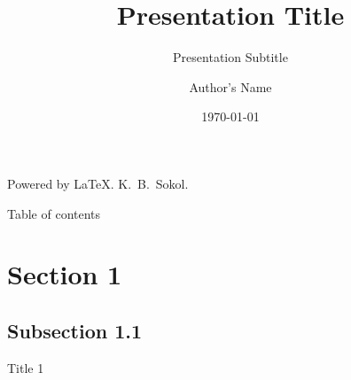 \documentclass[aspectratio=169]{beamer}
\begin{document}
\title{Presentation Title}
\subtitle{Presentation Subtitle}
\author{Author's Name}
\date{\today}

{
\begin{frame}[plain]
  \begin{minipage}{0.48\paperwidth}
    \vspace*{8.5cm}\hspace*{0.6cm}\tiny Powered by \LaTeX. K.\ B.\ Sokol.%
  \end{minipage}%
  \begin{minipage}{0.42\paperwidth}
    \vspace*{3.1cm}\titlepage%
  \end{minipage}
\end{frame}
}

\begin{frame}[plain]{Table of contents}%
  \begin{minipage}{13mm}
    \vspace{0pt}
    \hfill
  \end{minipage}\begin{minipage}{0.9\textwidth}
    \vspace{0pt}
    \tableofcontents
  \end{minipage}
\end{frame}


\section{Section 1} 
  \subsection{Subsection 1.1}
  \begin{frame}[foot]{Title 1}
  \begin{adjustwidth}{13mm}{0mm}
    \lipsum[1]~\cite{articleExample}
  \end{adjustwidth}
  \end{frame}
\end{document}
